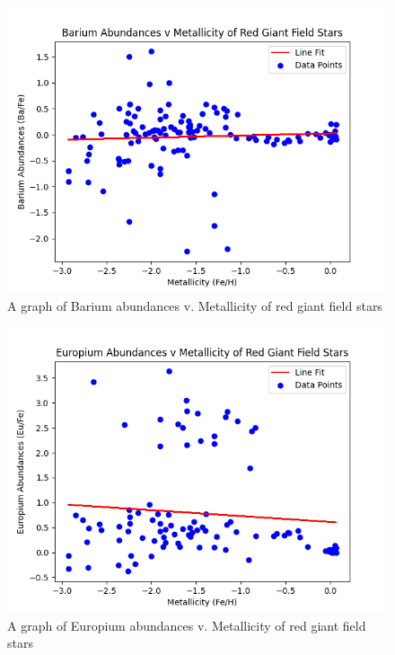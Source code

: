 \begin{figure}[H]
  \includegraphics[width=\textwidth]{Ba_v_Metal.png}
  \caption{A graph of Barium abundances v. Metallicity of red giant field stars}
  \label{Ba_v_Metal}
\end{figure}

\begin{figure}[H]
  \includegraphics[width=\textwidth]{Eu_v_Metal.png}
  \caption{A graph of Europium abundances v. Metallicity of red giant field stars}
  \label{Eu_v_Metal}
\end{figure}


